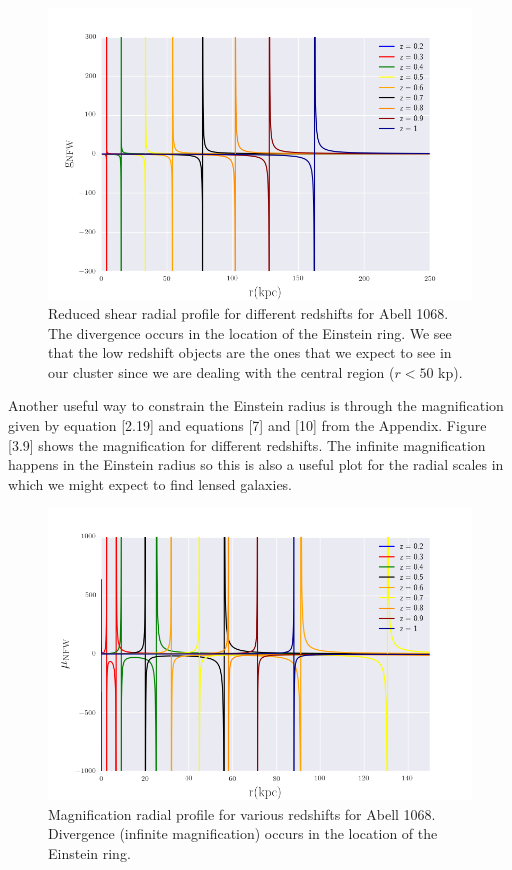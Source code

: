 \begin{figure}[H]
\centering
\includegraphics[width=12cm]{images/Reduced_Shear.png}
\caption[Reduced shear radial]{Reduced shear radial profile for different redshifts for Abell 1068. The divergence occurs in the location of the Einstein ring. We see that the low redshift objects are the ones that we expect to see in our cluster since we are dealing with the central region ($r<50$ kp).}
\end{figure}

Another useful way to constrain the Einstein radius is through the magnification given by equation [2.19] and equations [7] and [10] from the Appendix. Figure [3.9] shows the magnification for different redshifts. The infinite magnification happens in the Einstein radius so this is also a useful plot for the radial scales in which we might expect to find lensed galaxies.

\begin{figure}[H]
\centering
\includegraphics[width=12cm]{images/Magnification.png}
\caption[Magnification radial profile]{Magnification radial profile for various redshifts for Abell 1068. Divergence (infinite magnification) occurs in the location of the Einstein ring.}
\end{figure}

